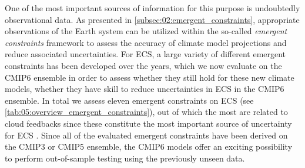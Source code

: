 One of the most important sources of information for this purpose is
undoubtedly observational data. As presented in
\cref{subsec:02:emergent_constraints}, appropriate observations of the Earth
system can be utilized within the so-called \emph{emergent constraints}
framework to assess the accuracy of climate model projections and reduce
associated uncertainties. For \ac{ECS}, a large variety of different emergent
constraints has been developed over the years, which we now evaluate on the
\acs{CMIP}6 ensemble in order to assess whether they still hold for these new
climate models, \ie{} whether they have skill to reduce uncertainties in
\ac{ECS} in the \acs{CMIP}6 ensemble. In total we assess eleven emergent
constraints on \ac{ECS} (see \cref{tab:05:overview_emergent_constraints}), out
of which the most are related to cloud feedbacks since these constitute the
most important source of uncertainty for \ac{ECS} . Since all of the
evaluated emergent constraints have been derived on the \acs{CMIP}3 or
\acs{CMIP}5 ensemble, the \acs{CMIP}6 models offer an exciting possibility to
perform out-of-sample testing using the previously unseen data.

